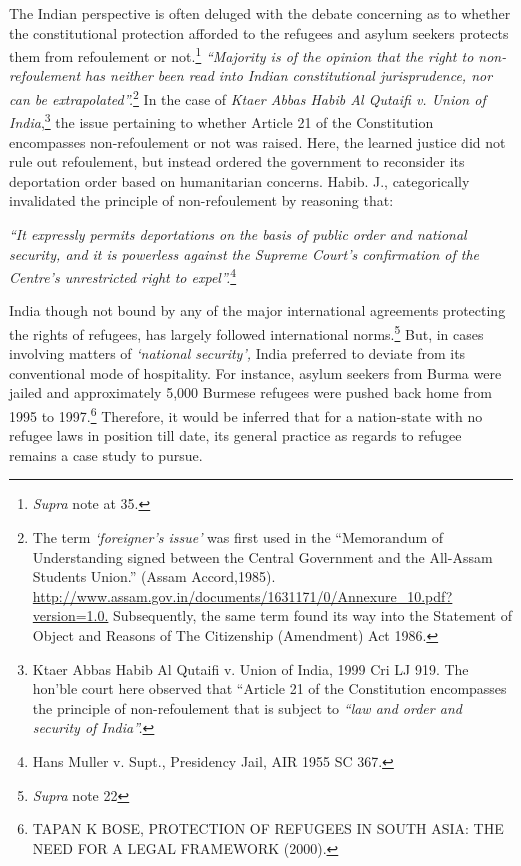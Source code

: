 \begin{multicols}{2}
\noi
The Indian perspective is often deluged with the debate concerning as to whether the
constitutional protection afforded to the refugees and asylum seekers protects them from
refoulement or not.\footnote{\textit{Supra} note at 35.}  \textit{“Majority is of the opinion that the right to non-refoulement has neither
been read into Indian constitutional jurisprudence, nor can be extrapolated”.}\footnote{The term \textit{‘foreigner’s issue’} was first used in the “Memorandum of Understanding signed between the Central Government and the All-Assam Students Union.” (Assam Accord,1985).\\ \url{http://www.assam.gov.in/documents/1631171/0/Annexure_10.pdf?version=1.0.} Subsequently, the same term found its way into the Statement of Object and Reasons of The Citizenship (Amendment) Act 1986.} In the case of \textit{Ktaer Abbas Habib Al Qutaifi v. Union of India},\footnote{Ktaer Abbas Habib Al Qutaifi v. Union of India, 1999 Cri LJ 919. The hon’ble court here observed that “Article 21 of the Constitution encompasses the principle of non-refoulement that is subject to \textit{“law and order and security of India”.}} the issue pertaining to whether Article 21 of the Constitution encompasses non-refoulement or not was raised. Here, the learned justice
did not rule out refoulement, but instead ordered the government to reconsider its deportation
order based on humanitarian concerns. Habib. J., categorically invalidated the principle of
non-refoulement by reasoning that:

\noi
\textit{“It expressly permits deportations on the basis of public order and national security, and it is
powerless against the Supreme Court’s confirmation of the Centre’s unrestricted right to
expel”.}\footnote{Hans Muller v. Supt., Presidency Jail, AIR 1955 SC 367.}


\noi
India though not bound by any of the major international agreements protecting the rights of
refugees, has largely followed international norms.\footnote{\textit{Supra} note 22} But, in cases involving matters of
\textit{‘national security’,} India preferred to deviate from its conventional mode of hospitality. For
instance, asylum seekers from Burma were jailed and approximately 5,000 Burmese refugees
were pushed back home from 1995 to 1997.\footnote{TAPAN K BOSE, PROTECTION OF REFUGEES IN SOUTH ASIA: THE NEED FOR A LEGAL
FRAMEWORK (2000).} Therefore, it would be inferred that for a nation-state with no refugee laws in position till date, its general practice as regards to refugee remains a case study to pursue.


\end{multicols}
